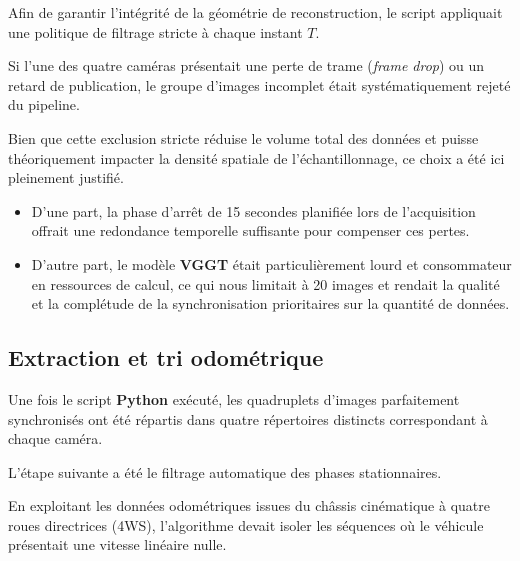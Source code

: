 \documentclass[12pt,a4paper,oneside]{report}
\begin{document}
\newpage

\hspace*{1cm}Afin de garantir l'intégrité de la géométrie de reconstruction, le script appliquait une politique de filtrage stricte à chaque instant $T$.\vspace{0.1cm}

\hspace*{.5cm} Si l'une des quatre caméras présentait une perte de trame (\textit{frame drop}) ou un retard de publication, le groupe d'images incomplet était systématiquement rejeté du pipeline.\vspace{0.1cm}

\hspace*{1cm} Bien que cette exclusion stricte réduise le volume total des données et puisse théoriquement impacter la densité spatiale de l'échantillonnage, ce choix a été ici pleinement justifié.\vspace{0.05cm}

\begin{itemize}[itemsep=0.5em]
	\item D'une part, la phase d'arrêt de 15 secondes planifiée lors de l'acquisition offrait une redondance temporelle suffisante pour compenser ces pertes.
	\item D'autre part, le modèle \textbf{VGGT} était particulièrement lourd et consommateur en ressources de calcul, ce qui nous limitait à 20 images et rendait la qualité et la complétude de la synchronisation prioritaires sur la quantité de données.
\end{itemize}

\bigskip


\subsection{Extraction et tri odométrique }

\vspace{1cm}

\hspace*{1cm}Une fois le script \textbf{Python} exécuté, les quadruplets d'images parfaitement synchronisés ont été répartis dans quatre répertoires distincts correspondant à chaque caméra.\vspace{0.1cm}

\hspace*{0.5cm}L'étape suivante a été le filtrage automatique des phases stationnaires.\vspace{0.05cm}

\hspace*{1cm} En exploitant les données odométriques issues du châssis cinématique à quatre roues directrices (4WS), l'algorithme devait isoler les séquences où le véhicule présentait une vitesse linéaire nulle.\vspace{0.1cm}
\end{document}
